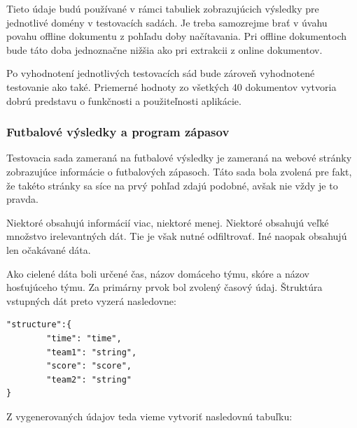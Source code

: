 \bigskip

Tieto údaje budú používané v rámci tabuliek zobrazujúcich výsledky pre jednotlivé domény v testovacích sadách. Je treba samozrejme brať v úvahu povahu offline dokumentu z pohľadu doby načítavania. Pri offline dokumentoch bude táto doba jednoznačne nižšia ako pri extrakcii z online dokumentov. 

Po vyhodnotení jednotlivých testovacích sád bude zároveň vyhodnotené testovanie ako také. Priemerné hodnoty zo všetkých 40 dokumentov vytvoria dobrú predstavu o funkčnosti a použiteľnosti aplikácie.

\newpage

\subsubsection{Futbalové výsledky a program zápasov}
\label{football}

Testovacia sada zameraná na futbalové výsledky je zameraná na webové stránky zobrazujúce informácie o futbalových zápasoch. Táto sada bola zvolená pre fakt, že takéto stránky sa síce na prvý pohľad zdajú podobné, avšak nie vždy je to pravda. 

Niektoré obsahujú informácií viac, niektoré menej. Niektoré obsahujú veľké množstvo irelevantných dát. Tie je však nutné odfiltrovať. Iné naopak obsahujú len očakávané dáta.

\bigskip

Ako cielené dáta boli určené čas, názov domáceho týmu, skóre a názov hosťujúceho týmu. Za primárny prvok bol zvolený časový údaj. Štruktúra vstupných dát preto vyzerá nasledovne:

\bigskip

\begin{lstlisting}
"structure":{
        "time": "time",
        "team1": "string",
        "score": "score",
        "team2": "string"
}
\end{lstlisting}

\bigskip

Z vygenerovaných údajov teda vieme vytvoriť nasledovnú tabuľku:

